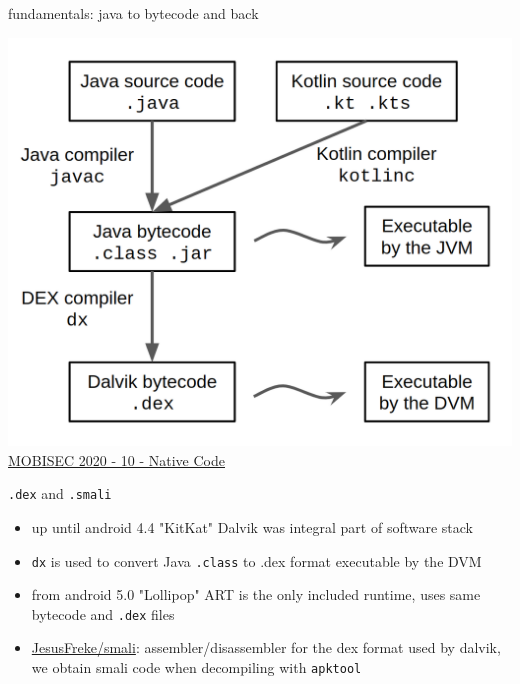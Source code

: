 \documentclass{beamer}
\begin{document}
\begin{frame}{fundamentals: java to bytecode and back}

    \centering \includegraphics[scale=0.2]{java-to-dex.png}\\
    \href{https://docs.google.com/presentation/d/14nid9QJrSRUd4T_48KZMhWqKT_UdLg7EM-RH0HFQYdM}{MOBISEC 2020 - 10 - Native Code}

\end{frame}

\begin{frame}{\texttt{.dex} and \texttt{.smali}}

    \begin{itemize}
        \item up until android 4.4 "KitKat" Dalvik was integral part of software stack
        \item \texttt{dx} is used to convert Java \texttt{.class} to {.dex} format executable by the DVM
        \item from android 5.0 "Lollipop" ART is the only included runtime, uses same bytecode and \texttt{.dex} files
        \item \href{https://github.com/JesusFreke/smali}{JesusFreke/smali}: assembler/disassembler for the dex format used by dalvik, we obtain smali code when decompiling with \texttt{apktool}
    \end{itemize}

\end{frame}


\end{document}
